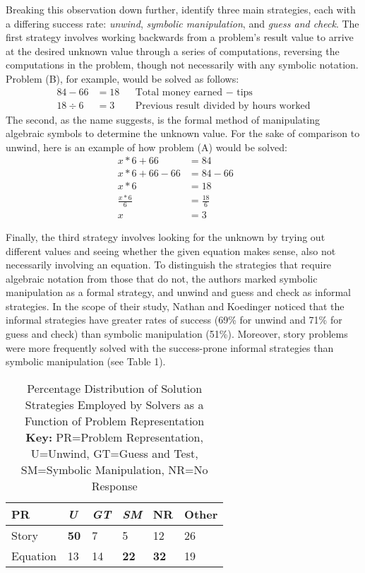 \documentclass[10pt,letterpaper]{article}
\begin{document}
	Breaking this observation down further,  identify three main strategies, each with a differing success rate: \textit{unwind}, \textit{symbolic manipulation}, and \textit{guess and check}. The first strategy involves working backwards from a problem's result value to arrive at the desired unknown value through a series of computations, reversing the computations in the problem, though not necessarily with any symbolic notation. Problem (B), for example, would be solved as follows:
	\begin{align*}
		 84 - 66 &= 18 && \text{Total money earned $-$ tips} \\
		 18 \div 6 &= 3 && \text{Previous result divided by hours worked}
	\end{align*}
	The second, as the name suggests, is the formal method of manipulating algebraic symbols to determine the unknown value. For the sake of comparison to unwind, here is an example of how problem (A) would be solved:
	\begin{align*}
		x * 6 + 66 &= 84 && \\
		x * 6 + 66 - 66 &= 84 - 66 && \\
		x*6 &= 18 && \\
		\frac{x*6}{6} &= \frac{18}{6} && \\
		x &= 3
	\end{align*}	
	
	
	Finally, the third strategy involves looking for the unknown by trying out different values and seeing whether the given equation makes sense, also not necessarily involving an equation. To distinguish the strategies that require algebraic notation from those that do not, the authors marked symbolic manipulation as a formal strategy, and unwind and guess and check as informal strategies. In the scope of their study, Nathan and Koedinger noticed that the informal strategies have greater rates of success (69\% for unwind and 71\% for guess and check) than symbolic manipulation (51\%). Moreover, story problems were more frequently solved with the success-prone informal strategies than symbolic manipulation (see Table 1). %
	\begin{table}[!ht]
		\begin{center} 
			\label{strategies_employed} 
			\vskip 0.12in
			\begin{tabular}{llllll} 
				\hline
				PR    &  \textit{U} & \textit{GT} & \textit{SM} & NR & Other \\
				\hline
				Story        &   \textbf{50} & 7 & 5 & 12 & 26\\
				Equation   &   13 & 14 & \textbf{22} & \textbf{32} & 19 \\
				\hline
			\end{tabular} 
			\caption{Percentage Distribution of Solution Strategies Employed by Solvers as a Function of Problem Representation \cite{KoedNath2004}\\
			\textbf{Key:} PR=Problem Representation, U=Unwind, GT=Guess and Test, SM=Symbolic Manipulation, NR=No Response} 
		\end{center} 
	\end{table}
	
\end{document}

